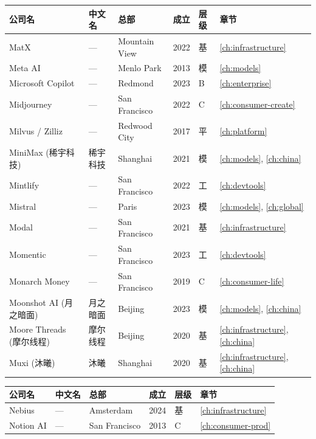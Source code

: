 \bigskip

\nopagebreak
\begin{tabularx}{\textwidth}{@{}l X l l l l@{}}
\toprule
\rowcolor{figLightGray}
\textbf{公司名} & \textbf{中文名} & \textbf{总部} & \textbf{成立} & \textbf{层级} & \textbf{章节} \\
\midrule
MatX                & ---             & Mountain View & 2022 & 基   & \ref{ch:infrastructure} \\
Meta AI             & ---             & Menlo Park    & 2013 & 模   & \ref{ch:models} \\
Microsoft Copilot   & ---             & Redmond       & 2023 & B    & \ref{ch:enterprise} \\
Midjourney          & ---             & San Francisco & 2022 & C    & \ref{ch:consumer-create} \\
Milvus / Zilliz     & ---             & Redwood City  & 2017 & 平   & \ref{ch:platform} \\
MiniMax (稀宇科技)  & 稀宇科技        & Shanghai      & 2021 & 模   & \ref{ch:models}, \ref{ch:china} \\
Mintlify            & ---             & San Francisco & 2022 & 工   & \ref{ch:devtools} \\
Mistral             & ---             & Paris         & 2023 & 模   & \ref{ch:models}, \ref{ch:global} \\
Modal               & ---             & San Francisco & 2021 & 基   & \ref{ch:infrastructure} \\
Momentic            & ---             & San Francisco & 2023 & 工   & \ref{ch:devtools} \\
Monarch Money       & ---             & San Francisco & 2019 & C    & \ref{ch:consumer-life} \\
Moonshot AI (月之暗面) & 月之暗面     & Beijing       & 2023 & 模   & \ref{ch:models}, \ref{ch:china} \\
Moore Threads (摩尔线程) & 摩尔线程   & Beijing       & 2020 & 基   & \ref{ch:infrastructure}, \ref{ch:china} \\
Muxi (沐曦)         & 沐曦            & Shanghai      & 2020 & 基   & \ref{ch:infrastructure}, \ref{ch:china} \\
\bottomrule
\end{tabularx}

\bigskip

\nopagebreak
\begin{tabularx}{\textwidth}{@{}l X l l l l@{}}
\toprule
\rowcolor{figLightGray}
\textbf{公司名} & \textbf{中文名} & \textbf{总部} & \textbf{成立} & \textbf{层级} & \textbf{章节} \\
\midrule
Nebius              & ---             & Amsterdam     & 2024 & 基   & \ref{ch:infrastructure} \\
Notion AI           & ---             & San Francisco & 2013 & C    & \ref{ch:consumer-prod} \\
\bottomrule
\end{tabularx}

